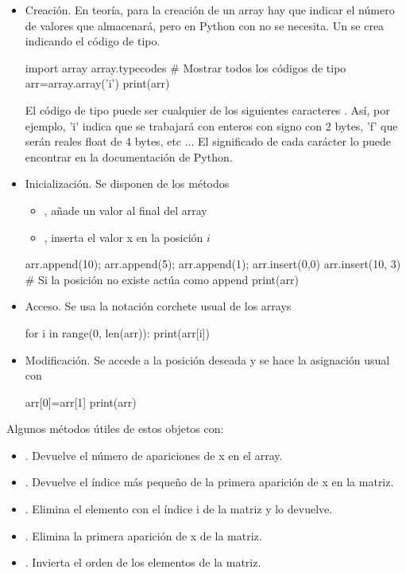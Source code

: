 \begin{itemize}
\item Creación. En teoría, para la creación de un array hay que indicar el número de valores que almacenará, pero en Python con   no se necesita. Un  se crea indicando el código de tipo.
\begin{pyconsole}[][frame=single]
import array
array.typecodes  # Mostrar todos los códigos de tipo
arr=array.array('i')
print(arr)
\end{pyconsole}


El código de tipo puede ser cualquier de los siguientes caracteres  . Así, por ejemplo, 'i' indica que se trabajará con enteros con signo con 2 bytes, 'f' que serán reales float de 4 bytes, etc ... El significado de cada carácter lo puede encontrar en la documentación de Python.

\item Inicialización. Se disponen de los métodos 

\begin{itemize}
\item {}, añade un valor al final del array
\item {}, inserta el valor x en la posición $i$
\end{itemize}

\begin{pyconsole}[][frame=single]
arr.append(10); arr.append(5); arr.append(1); 
arr.insert(0,0)
arr.insert(10, 3) # Si la posición no existe actúa como append
print(arr)
\end{pyconsole}

\item Acceso. Se usa la notación corchete usual de los arrays
\begin{pyconsole}[][frame=single]
for i in range(0, len(arr)):
    print(arr[i])

\end{pyconsole}


\item Modificación. Se accede a la posición deseada y se hace la asignación usual con \cm{=}
\begin{pyconsole}[][frame=single]
arr[0]=arr[1]
print(arr)
\end{pyconsole}

\end{itemize}

Algunos métodos útiles de estos objetos con:
\begin{itemize}
\item {}. Devuelve el número de apariciones de x en el array.
\item {}. Devuelve el índice más pequeño de la primera aparición de x en la matriz.
\item {}. Elimina el elemento con el índice i de la matriz y lo devuelve. 
\item {}. Elimina la primera aparición de x de la matriz.
\item {}. Invierta el orden de los elementos de la matriz.
\end{itemize}


